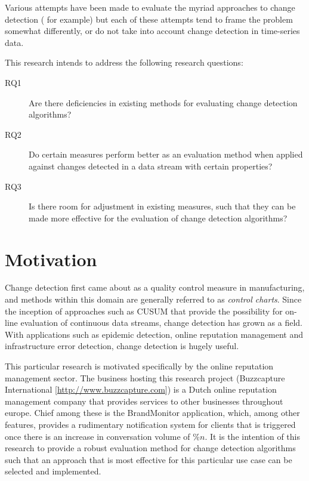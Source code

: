 \documentclass{uvamscse}	%
\begin{document}
Various attempts have been made to evaluate the myriad approaches to change detection (\cite{Buntain2014} for example) but each of these attempts tend to frame the problem somewhat differently, or do not take into account change detection in time-series data.

This research intends to address the following research questions:

\begin{description}
	\item[RQ1] Are there deficiencies in existing methods for evaluating change detection algorithms?
	\item[RQ2] Do certain measures perform better as an evaluation method when applied against changes detected in a data stream with certain properties?
	\item[RQ3] Is there room for adjustment in existing measures, such that they can be made more effective for the evaluation of change detection algorithms?
\end{description}


\section{Motivation}

Change detection first came about as a quality control measure in manufacturing, and methods within this domain are generally referred to as \emph{control charts}. Since the inception of approaches such as CUSUM that provide the possibility for on-line evaluation of continuous data streams, change detection has grown as a field. With applications such as epidemic detection, online reputation management and infrastructure error detection, change detection is hugely useful.

This particular research is motivated specifically by the online reputation management sector. The business hosting this research project (Buzzcapture International [\url{http://www.buzzcapture.com}]) is a Dutch online reputation management company that provides services to other businesses throughout europe. Chief among these is the BrandMonitor application, which, among other features, provides a rudimentary notification system for clients that is triggered once there is an increase in conversation volume of \(\%n\). It is the intention of this research to provide a robust evaluation method for change detection algorithms such that an approach that is most effective for this particular use case can be selected and implemented.
\end{document}
